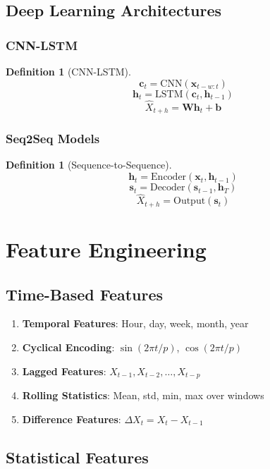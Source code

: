\documentclass[11pt,a4paper]{article}
\newtheorem{definition}[theorem]{Definition}
\begin{document}
\subsection{Deep Learning Architectures}

\subsubsection{CNN-LSTM}

\begin{definition}[CNN-LSTM]
$$\mathbf{c}_t = \text{CNN}(\mathbf{x}_{t-w:t})$$
$$\mathbf{h}_t = \text{LSTM}(\mathbf{c}_t, \mathbf{h}_{t-1})$$
$$\hat{X}_{t+h} = \mathbf{W}\mathbf{h}_t + \mathbf{b}$$
\end{definition}

\subsubsection{Seq2Seq Models}

\begin{definition}[Sequence-to-Sequence]
$$\mathbf{h}_t = \text{Encoder}(\mathbf{x}_t, \mathbf{h}_{t-1})$$
$$\mathbf{s}_t = \text{Decoder}(\mathbf{s}_{t-1}, \mathbf{h}_T)$$
$$\hat{X}_{t+h} = \text{Output}(\mathbf{s}_t)$$
\end{definition}

\section{Feature Engineering}

\subsection{Time-Based Features}

\begin{enumerate}
\item \textbf{Temporal Features}: Hour, day, week, month, year
\item \textbf{Cyclical Encoding}: $\sin(2\pi t/p)$, $\cos(2\pi t/p)$
\item \textbf{Lagged Features}: $X_{t-1}, X_{t-2}, \ldots, X_{t-p}$
\item \textbf{Rolling Statistics}: Mean, std, min, max over windows
\item \textbf{Difference Features}: $\Delta X_t = X_t - X_{t-1}$
\end{enumerate}

\subsection{Statistical Features}
\end{document}

